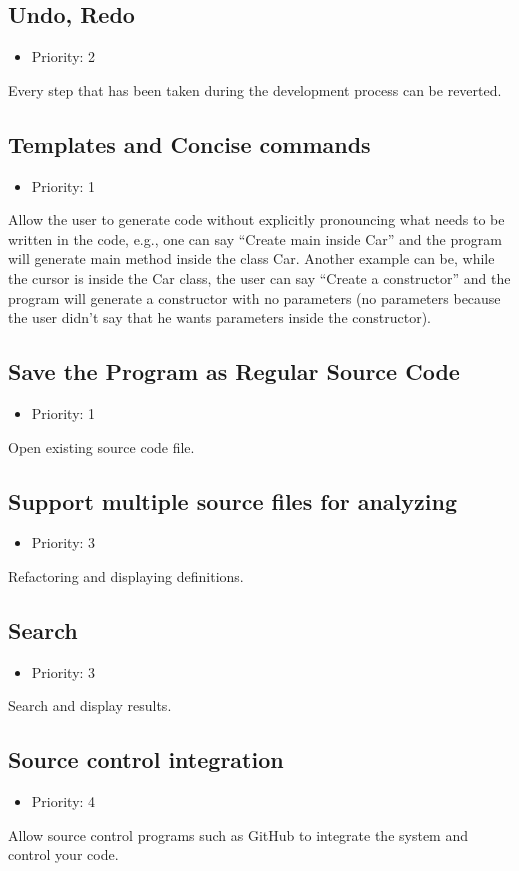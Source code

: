 \subsection{Undo, Redo}
\begin{itemize}
	\item Priority: 2
\end{itemize}
Every step that has been taken during the development process can be reverted.
\subsection{Templates and Concise commands}
\begin{itemize}
	\item Priority: 1
\end{itemize}
Allow the user to generate code without explicitly pronouncing what needs to be written in the code, e.g., one can say  “Create main inside Car” and the program will generate main method inside the class Car. Another example can be, while the cursor is inside the Car class, the user can say “Create a constructor” and the program will generate a constructor with no parameters (no parameters because the user didn’t say that he wants parameters inside the constructor).
\subsection{Save the Program as Regular Source Code}
\begin{itemize}
	\item Priority: 1
\end{itemize}
Open existing source code file.
\subsection{Support multiple source files for analyzing}
\begin{itemize}
	\item Priority: 3
\end{itemize}
Refactoring and displaying definitions.
\subsection{Search}
\begin{itemize}
	\item Priority: 3
\end{itemize}
Search and display results.
\subsection{Source control integration}
\begin{itemize}
	\item Priority: 4
\end{itemize}
Allow source control programs such as GitHub to integrate the system and control your code.

